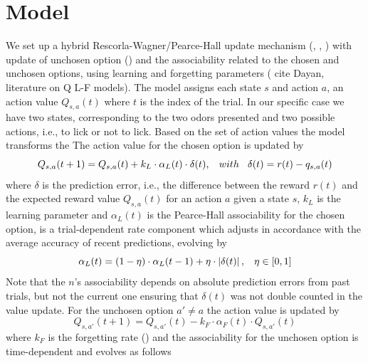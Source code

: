 \section{Model}
We set up a hybrid Rescorla-Wagner/Pearce-Hall update mechanism (\cite{Koppe}, \cite{Costa}, \cite{Li}) with update of unchosen option (\cite{Katahira}) and the associability related to the chosen and unchosen options, using learning and forgetting parameters ({\color{red} cite Dayan, literature on Q L-F models}).
The model assigns each state $s$ and action $a$, an action value $Q_{s,a}(t)$ where $t$ is the index of the trial. In our specific case we have two states, corresponding to the two odors presented and two possible actions, i.e., to lick or not to lick. 
Based on the set of action values the model transforms the The action value for the chosen option is updated by
\begin{equation}
Q_{s,a}(t+1)  = Q_{s,a}(t)+k_L\cdot\alpha_L(t)\cdot\delta(t), \hspace{0.3cm} with \hspace{0.3cm}\delta(t)=r(t)-q_{s,a}(t)
\label{eq:Qlearning}
\end{equation}
where $\delta$ is the prediction error, i.e., the difference between the reward $r(t)$ and the expected reward value $Q_{s,a}(t)$ for an action $a$ given a state $s$, $k_L$ is the learning parameter and $\alpha_L(t)$ is the Pearce-Hall associability for the chosen option, is a trial-dependent rate component which adjusts in
accordance with the average accuracy of recent predictions, evolving by
\begin{equation}
    \alpha_L(t)=(1-\eta)\cdot\alpha_L(t-1)+\eta\cdot\left\lvert\delta(t)\right\rvert,\hspace{0.3cm} \eta\in[0,1]
    \label{eq:Alphalearning}
\end{equation}
Note that the $n$'s associability depends on absolute prediction errors from past trials, but not the current one ensuring that $\delta(t)$ was not double counted in the value update. 
For the unchosen option $a'\neq a$ the action value is updated by
\begin{equation}
    Q_{s,a'}(t+1) = Q_{s,a'}(t)-k_F\cdot\alpha_F(t)\cdot Q_{s,a'}(t)
    \label{eq:Qforgetting}
\end{equation}
where $k_F$ is the forgetting rate (\cite{ItoDoya}) and the associability for the unchosen option is time-dependent and evolves as follows
